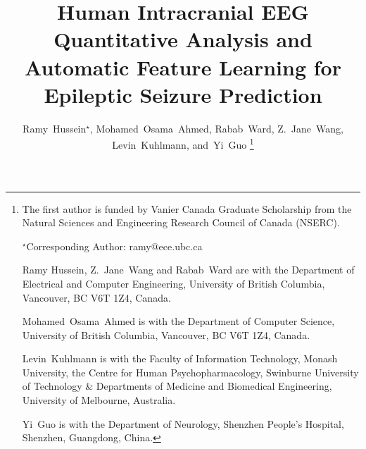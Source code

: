 \documentclass[journal]{IEEEtran}
\begin{document}
\title{Human Intracranial EEG Quantitative Analysis and Automatic Feature Learning for Epileptic Seizure Prediction}


\author{Ramy~Hussein$^{\star}$, Mohamed~Osama~Ahmed, Rabab~Ward, Z.~Jane~Wang, Levin~Kuhlmann, and~Yi~Guo
\thanks{The first author is funded by Vanier Canada Graduate Scholarship from the Natural Sciences and Engineering Research Council of Canada (NSERC).

$^\star$Corresponding Author: ramy@ece.ubc.ca 

Ramy Hussein, Z.~Jane~Wang and Rabab~Ward are with the Department of Electrical and Computer Engineering, University of British Columbia, Vancouver, BC V6T 1Z4, Canada.

Mohamed~Osama~Ahmed is with the Department of Computer Science, University of British Columbia, Vancouver, BC V6T 1Z4, Canada.

Levin~Kuhlmann is with the Faculty of Information Technology, Monash University, the Centre for Human Psychopharmacology, Swinburne University of Technology \& Departments of Medicine and Biomedical Engineering, University of Melbourne, Australia.

Yi~Guo is with the Department of Neurology, Shenzhen People's Hospital, Shenzhen, Guangdong, China.

}
}
\maketitle
\end{document}
